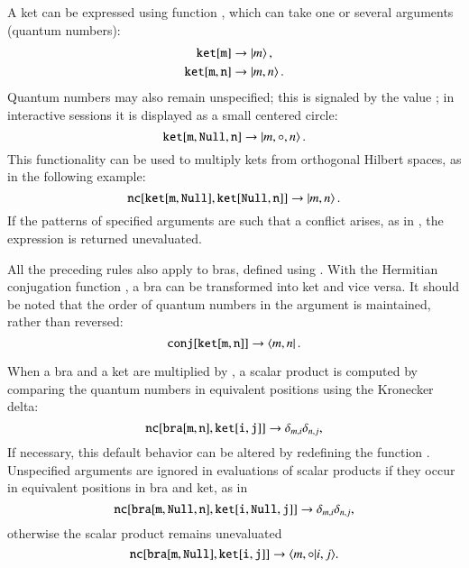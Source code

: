 \documentclass[3p,number,preprint]{elsarticle}
\begin{document}
A ket can be expressed using function , which can take one or
several arguments (quantum numbers):
%
\begin{equation}
\begin{split}
{\tt ket[m]} &\to \left| m \right\rangle,\\
{\tt ket[m,n]} &\to \left| m,n \right\rangle.
\end{split}
\end{equation}
%
Quantum numbers may also remain unspecified; this is signaled by the
value ; in interactive sessions it is displayed as a small
centered circle:
%
\begin{equation}
{\tt ket[m,Null,n]} \to \left| m,\circ,n \right\rangle.
\end{equation}
%
This functionality can be used to multiply kets from orthogonal
Hilbert spaces, as in the following example:
%
\begin{equation}
{\tt nc[ket[m,Null], ket[Null,n]]} \to \left| m,n \right\rangle.
\end{equation}
%
If the patterns of specified arguments are such that a conflict
arises, as in , the expression is
returned unevaluated.

All the preceding rules also apply to bras, defined using .
With the Hermitian conjugation function , a bra can be
transformed into ket and vice versa. It should be noted that the order
of quantum numbers in the argument is maintained, rather than reversed:
%
\begin{equation}
{\tt conj[ket[m,n]]} \to \left\langle m,n \right|.
\end{equation}

When a bra and a ket are multiplied by , a scalar product is
computed by comparing the quantum numbers in equivalent positions
using the Kronecker delta:
%
\begin{equation}
{\tt nc[bra[m,n],ket[i,j]]} \to \delta_{m,i} \delta_{n,j},
\end{equation}
%
If necessary, this default behavior can be altered by redefining the
function . Unspecified arguments are ignored in
evaluations of scalar products if they occur in equivalent positions
in bra and ket, as in
%
\begin{equation}
{\tt nc[bra[m,Null,n],ket[i,Null,j]]} \to \delta_{m,i} \delta_{n,j},
\end{equation}
%
otherwise the scalar product remains unevaluated
%
\begin{equation}
{\tt nc[bra[m,Null],ket[i,j]]} \to \langle m,\circ|i,j \rangle.
\end{equation}
%
%
\end{document}
